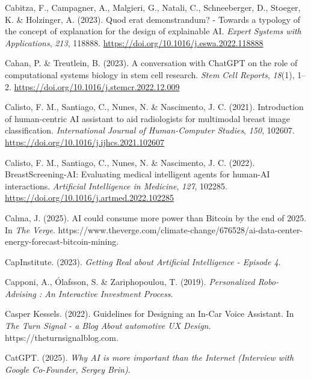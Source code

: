 \documentclass[
  letterpaper,
  DIV=11,
  numbers=noendperiod]{scrartcl}
\newlength{\cslhangindent}
\newenvironment{CSLReferences}[2] %
 {\begin{list}{}{%
  \setlength{\itemindent}{0pt}
  \setlength{\leftmargin}{0pt}
  \setlength{\parsep}{0pt}
  \ifodd #1
   \setlength{\leftmargin}{\cslhangindent}
   \setlength{\itemindent}{-1\cslhangindent}
  \fi
  \setlength{\itemsep}{#2\baselineskip}}}
 {\end{list}}
\begin{document}
\begin{CSLReferences}{1}{0}
Cabitza, F., Campagner, A., Malgieri, G., Natali, C., Schneeberger, D.,
Stoeger, K. \& Holzinger, A. (2023). Quod erat demonstrandum? -
{Towards} a typology of the concept of explanation for the design of
explainable {AI}. \emph{Expert Systems with Applications}, \emph{213},
118888. \url{https://doi.org/10.1016/j.eswa.2022.118888}

Cahan, P. \& Treutlein, B. (2023). A conversation with {ChatGPT} on the
role of computational systems biology in stem cell research. \emph{Stem
Cell Reports}, \emph{18}(1), 1--2.
\url{https://doi.org/10.1016/j.stemcr.2022.12.009}

Calisto, F. M., Santiago, C., Nunes, N. \& Nascimento, J. C. (2021).
Introduction of human-centric {AI} assistant to aid radiologists for
multimodal breast image classification. \emph{International Journal of
Human-Computer Studies}, \emph{150}, 102607.
\url{https://doi.org/10.1016/j.ijhcs.2021.102607}

Calisto, F. M., Santiago, C., Nunes, N. \& Nascimento, J. C. (2022).
{BreastScreening-AI}: {Evaluating} medical intelligent agents for
human-{AI} interactions. \emph{Artificial Intelligence in Medicine},
\emph{127}, 102285. \url{https://doi.org/10.1016/j.artmed.2022.102285}

Calma, J. (2025). {AI} could consume more power than {Bitcoin} by the
end of 2025. In \emph{The Verge}.
https://www.theverge.com/climate-change/676528/ai-data-center-energy-forecast-bitcoin-mining.

CapInstitute. (2023). \emph{Getting {Real} about {Artificial
Intelligence} - {Episode} 4}.

Capponi, A., Ólafsson, S. \& Zariphopoulou, T. (2019).
\emph{Personalized {Robo-Advising} : An {Interactive Investment
Process}}.

Casper Kessels. (2022). Guidelines for {Designing} an {In-Car Voice
Assistant}. In \emph{The Turn Signal - a Blog About automotive UX
Design}. https://theturnsignalblog.com.

CatGPT. (2025). \emph{Why {AI} is more important than the {Internet}
({Interview} with {Google Co-Founder}, {Sergey Brin})}.


\end{CSLReferences}
\end{document}

